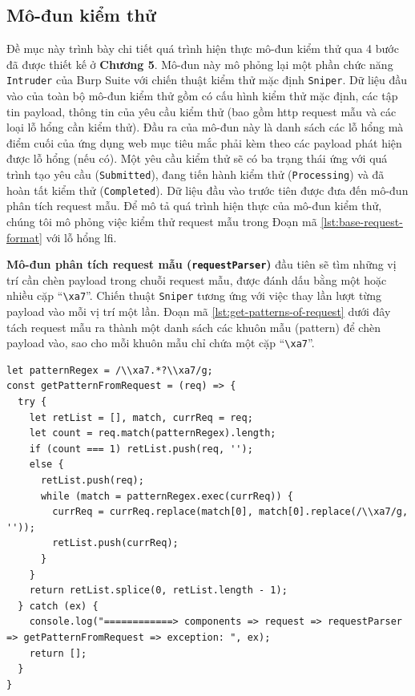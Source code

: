 \subsection{Mô-đun kiểm thử}
Đề mục này trình bày chi tiết quá trình hiện thực mô-đun kiểm thử qua 4 bước đã được thiết kế ở \textbf{Chương 5}. Mô-đun này mô phỏng lại một phần chức năng \texttt{Intruder} của Burp Suite với chiến thuật kiểm thử mặc định \texttt{Sniper}. Dữ liệu đầu vào của toàn bộ mô-đun kiểm thử gồm có cấu hình kiểm thử mặc định, các tập tin payload, thông tin của yêu cầu kiểm thử (bao gồm \acrshort{http} request mẫu và các loại lỗ hổng cần kiểm thử). Đầu ra của mô-đun này là danh sách các lỗ hổng mà điểm cuối của ứng dụng web mục tiêu mắc phải kèm theo các payload phát hiện được lỗ hổng (nếu có). Một yêu cầu kiểm thử sẽ có ba trạng thái ứng với quá trình tạo yêu cầu (\texttt{Submitted}), đang tiến hành kiểm thử (\texttt{Processing}) và đã hoàn tất kiểm thử (\texttt{Completed}). Dữ liệu đầu vào trước tiên được đưa đến mô-đun phân tích request mẫu. Để mô tả quá trình hiện thực của mô-đun kiểm thử, chúng tôi mô phỏng việc kiểm thử request mẫu trong Đoạn mã \ref{lst:base-request-format} với lỗ hổng \acrshort{lfi}.\par
\textbf{Mô-đun phân tích request mẫu (\texttt{requestParser})} đầu tiên sẽ tìm những vị trí cần chèn payload trong chuỗi request mẫu, được đánh dấu bằng một hoặc nhiều cặp ``\texttt{\textbackslash xa7}''. Chiến thuật \texttt{Sniper} tương ứng với việc thay lần lượt từng payload vào mỗi vị trí một lần. Đoạn mã \ref{lst:get-patterns-of-request} dưới đây tách request mẫu ra thành một danh sách các khuôn mẫu (pattern) để chèn payload vào, sao cho mỗi khuôn mẫu chỉ chứa một cặp ``\texttt{\textbackslash xa7}''.
\begin{lstlisting}[style=ES6, label={lst:get-patterns-of-request}, caption={Trích xuất khuôn mẫu từ request mẫu}]
let patternRegex = /\\xa7.*?\\xa7/g;
const getPatternFromRequest = (req) => {
  try {
    let retList = [], match, currReq = req;
    let count = req.match(patternRegex).length;
    if (count === 1) retList.push(req, '');
    else {
      retList.push(req);
      while (match = patternRegex.exec(currReq)) {
        currReq = currReq.replace(match[0], match[0].replace(/\\xa7/g, ''));
        retList.push(currReq);
      }
    }
    return retList.splice(0, retList.length - 1);
  } catch (ex) {
    console.log("============> components => request => requestParser => getPatternFromRequest => exception: ", ex);
    return [];
  }
}
\end{lstlisting}
